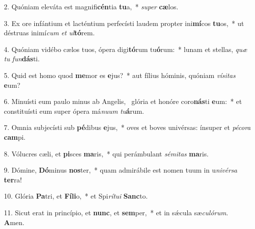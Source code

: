 2. Quóniam eleváta est magnifi\textbf{cén}tia \textbf{tu}a,~*  \textit{su}\textit{per} \textbf{cæ}los.\

3. Ex ore infántium et lacténtium perfecísti laudem propter ini\textbf{mí}cos \textbf{tu}os,~*  ut déstruas inimí\textit{cum} \textit{et} \textit{ul}\textbf{tó}rem.\

4. Quóniam vidébo cælos tuos, ópera digi\textbf{tó}rum tu\textbf{ó}rum:~*  lunam et stellas, \textit{quæ} \textit{tu} \textit{fun}\textbf{dás}ti.\

5. Quid est homo quod \textbf{me}mor es \textbf{e}jus?~*  aut fílius hóminis, quóniam \textit{ví}\textit{si}\textit{tas} \textbf{e}um?\

6. Minuísti eum paulo minus ab Angelis, \dag\  glória et honóre coro\textbf{nás}ti \textbf{e}um:~*  et constituísti eum super ópera má\textit{nu}\textit{um} \textit{tu}\textbf{á}rum.\

7. Omnia subjecísti sub \textbf{pé}dibus \textbf{e}jus,~*  oves et boves univérsas: ínsuper et \textit{pé}\textit{co}\textit{ra} \textbf{cam}pi.\

8. Vólucres cæli, et \textbf{pi}sces \textbf{ma}ris,~*  qui perámbulant \textit{sé}\textit{mi}\textit{tas} \textbf{ma}ris.\

9. Dómine, \textbf{Dó}minus \textbf{nos}ter,~*  quam admirábile est nomen tuum in u\textit{ni}\textit{vér}\textit{sa} \textbf{ter}ra!\

10. Glória \textbf{Pa}tri, et \textbf{Fí}\textbf{li}o,~*  et Spi\textit{rí}\textit{tu}\textit{i} \textbf{Sanc}to.\

11. Sicut erat in princípio, et \textbf{nunc}, et \textbf{sem}per,~*  et in sǽcula sæ\textit{cu}\textit{ló}\textit{rum}. \textbf{A}men.\

